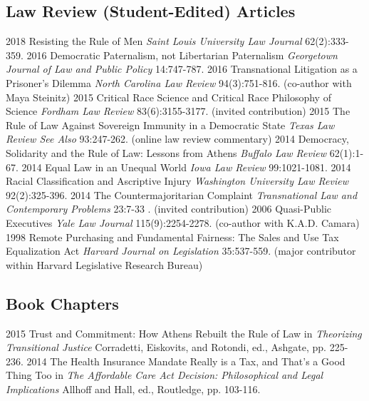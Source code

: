 \documentclass[letterpaper]{moderncv}
\begin{document}
\subsection{Law Review (Student-Edited) Articles}
\cventry
{2018}
{Resisting the Rule of Men}
{}
{\textit{Saint Louis University Law Journal}}
{}
{62(2):333-359. }
\vspace{1mm}
\cventry
{2016}
{Democratic Paternalism, not Libertarian Paternalism}
{}
{\textit{Georgetown Journal of Law and Public Policy}}
{}
{14:747-787. }
\vspace{1mm}
\cventry
{2016}
{Transnational Litigation as a Prisoner's Dilemma}
{}
{\textit{North Carolina Law Review}}
{}
{94(3):751-816. (co-author with Maya Steinitz)}
\vspace{1mm}
\cventry
{2015}
{Critical Race Science and Critical Race Philosophy of Science}
{}
{\textit{Fordham Law Review}}
{}
{83(6):3155-3177. (invited contribution)}
\vspace{1mm}
\cventry
{2015}
{The Rule of Law Against Sovereign Immunity in a Democratic State}
{}
{\textit{Texas Law Review See Also}}
{}
{93:247-262. (online law review commentary)}
\vspace{1mm}
\cventry
{2014}
{Democracy, Solidarity and the Rule of Law: Lessons from Athens}
{}
{\textit{Buffalo Law Review}}
{}
{62(1):1-67. }
\vspace{1mm}
\cventry
{2014}
{Equal Law in an Unequal World}
{}
{\textit{Iowa Law Review}}
{}
{99:1021-1081. }
\vspace{1mm}
\cventry
{2014}
{Racial Classification and Ascriptive Injury}
{}
{\textit{Washington University Law Review}}
{}
{92(2):325-396. }
\vspace{1mm}
\cventry
{2014}
{The Countermajoritarian Complaint}
{}
{\textit{Transnational Law and Contemporary Problems}}
{}
{23:7-33 . (invited contribution)}
\vspace{1mm}
\cventry
{2006}
{Quasi-Public Executives}
{}
{\textit{Yale Law Journal}}
{}
{115(9):2254-2278. (co-author with K.A.D. Camara)}
\vspace{1mm}
\cventry
{1998}
{Remote Purchasing and Fundamental Fairness: The Sales and Use Tax Equalization Act}
{}
{\textit{Harvard Journal on Legislation}}
{}
{35:537-559. (major contributor within Harvard Legislative Research Bureau)}
\vspace{1mm}
\vspace{1mm}
\subsection{Book Chapters}
\cventry
{2015}
{Trust and Commitment: How Athens Rebuilt the Rule of Law}
{}
{in \textit{Theorizing Transitional Justice}}
{}
{Corradetti, Eiskovits, and Rotondi, ed., Ashgate, pp. 225-236.}
\vspace{1mm}
\cventry
{2014}
{The Health Insurance Mandate Really is a Tax, and That's a Good Thing Too}
{}
{in \textit{The Affordable Care Act Decision: Philosophical and Legal Implications}}
{}
{Allhoff and Hall, ed., Routledge, pp. 103-116.}
\vspace{1mm}
\vspace{1mm}
\end{document}
